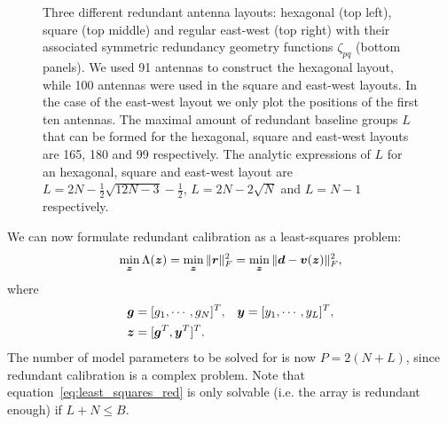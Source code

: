 \documentclass[useAMS,usenatbib]{mn2e}
\newcommand{\bz}{\bmath{z}}
\newcommand{\br}{\bmath{r}}
\newcommand{\bg}{\bmath{g}}
\newcommand{\bd}{\bmath{d}}
\newcommand{\bv}{\bmath{v}}
\newcommand{\by}{\bmath{y}}
\begin{document}
\begin{figure}
\caption{Three different redundant antenna layouts: hexagonal (top left), square (top middle) and regular east-west (top right) with their associated symmetric redundancy geometry functions $\zeta_{pq}$ (bottom panels). We used 91 antennas to construct the hexagonal layout, while 100 antennas were used in the square and east-west layouts. In the case of the east-west layout we only plot the positions of the first ten antennas. The maximal amount of redundant baseline groups $L$ that can be formed for 
the hexagonal, square and east-west layouts are 165, 180 and 99 respectively. The analytic expressions of $L$ for an hexagonal, square and east-west layout are $L = 2N-\frac{1}{2}\sqrt{12N-3}-\frac{1}{2}$,
$L=2N-2\sqrt{N}$ and $L=N-1$ respectively.\label{fig:geometry_function}}
\end{figure}

We can now formulate redundant calibration as a least-squares problem:
\begin{equation}
\label{eq:least_squares_red}
\min_{\bz} \Lambda(\bz) = \min_{\bz} \|\br\|_F^2 = \min_{\bz} \|\bd - \bv(\bz)\|_F^2, 
\end{equation}
where
\begin{align}
 \bg &=[g_1,\cdots,g_N]^T, & \by &= [y_1,\cdots,y_L]^T,\nonumber\\
 \bz &= [\bg^T,\by^T]^T. &  &\label{eq:parm_definitions}
 \end{align}
The number of model parameters to be solved for is now $P = 2(N+L)$, since redundant calibration is a complex problem. Note that equation~\ref{eq:least_squares_red} is only solvable 
(i.e. the array is redundant enough) if $L+N \leq B$.
\end{document}
